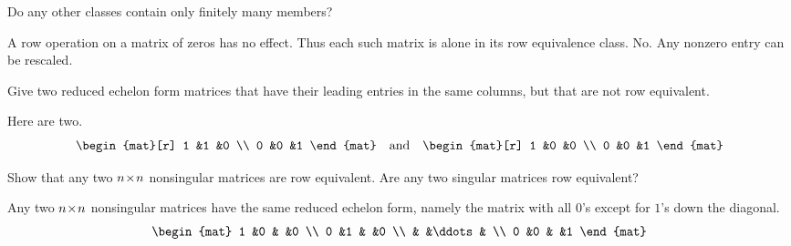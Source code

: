 \begin{exercises}
\begin{exparts}
      \partsitem Do any other classes contain only finitely many members?
    \end{exparts}
    \begin{answer}
     \begin{exparts}
      \partsitem A row operation on a matrix of zeros has no effect.
        Thus each such matrix is alone in its row equivalence class.  
      \partsitem No.
        Any nonzero entry can be rescaled.
     \end{exparts}
    \end{answer}
  \recommended \item 
    Give two reduced echelon form matrices that have their leading
    entries in the same columns,
    but that are not row equivalent.
    \begin{answer}
      Here are two.
      \begin{equation*}
        \begin{mat}[r]
          1  &1  &0  \\
          0  &0  &1
        \end{mat}
        \quad\text{and}\quad
        \begin{mat}[r]
          1  &0  &0  \\
          0  &0  &1
        \end{mat}
      \end{equation*}  
     \end{answer}
  \recommended \item 
    Show that any two \( n \! \times \! n \) nonsingular matrices are
    row equivalent.
    Are any two singular matrices row equivalent?
    \begin{answer}
      Any two \( n \! \times \! n \) nonsingular matrices have
      the same reduced echelon
      form, namely the matrix with all \( 0 \)'s except for \( 1 \)'s down
      the diagonal.
      \begin{equation*}
        \begin{mat}
          1  &0  &       &0  \\
          0  &1  &       &0  \\
             &   &\ddots &   \\
          0  &0  &       &1
        \end{mat}
      \end{equation*}


\end{answer}
\end{exercises}
